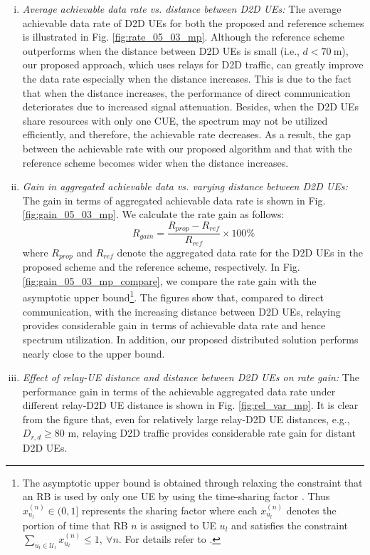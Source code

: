 \documentclass[twocolumn,10pt]{IEEEtran}
\begin{document}
\begin{enumerate}[(i)]
\item \textit{Average achievable data rate vs. distance between D2D UEs:} The average achievable data rate of D2D UEs for both the proposed and reference schemes is illustrated in Fig. \ref{fig:rate_05_03_mp}. Although the reference scheme outperforms when the distance between D2D UEs is small (i.e., $d < 70~ \text{m}$), our proposed approach, which uses relays for D2D traffic, can greatly improve the data rate especially when the distance increases. This is due to the fact that when the distance increases, the performance of direct communication deteriorates due to increased signal attenuation. Besides, when the D2D UEs share resources with only one CUE, the spectrum may not be utilized efficiently, and therefore, the achievable rate decreases. As a result, the gap between the achievable rate with our proposed algorithm and that with the reference scheme becomes wider when the distance increases.

\item \textit{Gain in aggregated achievable data vs. varying distance between D2D UEs:} The gain in terms of aggregated achievable data rate is shown in Fig. \ref{fig:gain_05_03_mp}. We calculate the rate gain as follows: 
\begin{equation}
R_{gain} = \frac{R_{prop} - R_{ref}}{R_{ref}} \times 100 \%
\end{equation} 
where $R_{prop}$ and  $R_{ref}$ denote the aggregated data rate for the D2D UEs in the proposed scheme and the reference scheme, respectively. In Fig. \ref{fig:gain_05_03_mp_compare}, we compare the rate gain with the asymptotic upper bound\footnote{The asymptotic upper bound is obtained through relaxing the constraint that an RB is used by only one UE by using the time-sharing factor \cite{relax-con-1}. Thus $x_{u_l}^{(n)} \in (0,1]$ represents the sharing factor where each $x_{u_l}^{(n)}$ denotes the portion of time that RB $n$ is assigned to UE $u_l$ and satisfies the constraint $\displaystyle \sum_{u_l \in \mathcal{U}_l} x_{u_l}^{(n)} \leq 1, ~\forall n$. For details refer to \cite{d2d_our_paper}.}. The figures show that, compared to direct communication, with the increasing distance between D2D UEs, relaying provides considerable gain in terms of achievable data rate and hence spectrum utilization. In addition, our proposed distributed solution performs nearly close to the upper bound.

\item \textit{Effect of relay-UE distance and distance between D2D UEs on rate gain:} The performance gain in terms of the achievable aggregated data rate under different relay-D2D UE distance is shown in Fig. \ref{fig:rel_var_mp}. It is clear from the figure that, even for relatively large relay-D2D UE distances, e.g., $D_{r,d} \geq 80$ m, relaying D2D traffic provides considerable rate gain for distant D2D UEs.



\end{enumerate}
\end{document}
